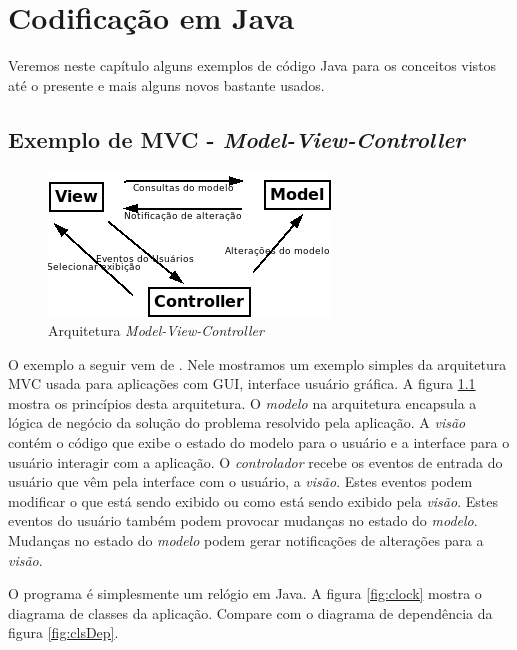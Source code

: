 \documentclass[
	11pt,				%
	openright,
	twoside,			%
	a4paper,			%
	english,			%
	french,
	brazil,				%
	sumario=tradicional
	]{abntex2}
\begin{document}
\chapter{Codificação em Java}

Veremos neste capítulo alguns exemplos de código Java para os conceitos vistos até o presente e mais alguns novos bastante usados.

\section{Exemplo de MVC - \emph{Model-View-Controller}}

\begin{figure}[h]
\begin{center}
\includegraphics[scale=0.7]{MVC.png} 
\caption{Arquitetura \emph{Model-View-Controller}} \label{fig:mvc}
\end{center}
\end{figure}

O exemplo a seguir vem de . Nele mostramos um exemplo simples da arquitetura MVC usada para aplicações com GUI, interface usuário gráfica. A figura \ref{fig:mvc} mostra os princípios desta arquitetura. O \emph{modelo} na arquitetura encapsula a lógica de negócio da solução do problema resolvido pela aplicação. A \emph{visão} contém o código que exibe o estado do modelo para o usuário e a interface para o usuário interagir com a aplicação. O \emph{controlador} recebe os eventos de entrada do usuário que vêm pela interface com o usuário, a \emph{visão}. Estes eventos podem modificar o que está sendo exibido ou como está sendo exibido pela \emph{visão}. Estes eventos do usuário também podem provocar mudanças no estado do \emph{modelo}. Mudanças no estado do \emph{modelo} podem gerar notificações de alterações para a \emph{visão}.

O programa é simplesmente um relógio em Java. A figura \ref{fig:clock} mostra o diagrama de classes da aplicação. Compare com o diagrama de dependência da figura \ref{fig:clsDep}.
\end{document}
